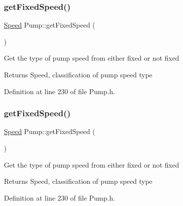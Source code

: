 \mbox{\label{class_pump_ae9a63b7e616ba2ef7723d1040af241b4}} 
\subsubsection{\texorpdfstring{get\+Fixed\+Speed()}{getFixedSpeed()}\hspace{0.1cm}{\footnotesize\ttfamily [1/3]}}
{\footnotesize\ttfamily \hyperlink{class_pump_ae443603074ebca82f0b89209482d10b6}{Speed} Pump\+::get\+Fixed\+Speed (\begin{DoxyParamCaption}{ }\end{DoxyParamCaption})\hspace{0.3cm}{\ttfamily [inline]}}

Get the type of pump speed from either fixed or not fixed

\begin{DoxyReturn}{Returns}
Speed, classification of pump speed type 
\end{DoxyReturn}


Definition at line 230 of file Pump.\+h.

\mbox{\label{class_pump_ae9a63b7e616ba2ef7723d1040af241b4}} 
\subsubsection{\texorpdfstring{get\+Fixed\+Speed()}{getFixedSpeed()}\hspace{0.1cm}{\footnotesize\ttfamily [2/3]}}
{\footnotesize\ttfamily \hyperlink{class_pump_ae443603074ebca82f0b89209482d10b6}{Speed} Pump\+::get\+Fixed\+Speed (\begin{DoxyParamCaption}{ }\end{DoxyParamCaption})\hspace{0.3cm}{\ttfamily [inline]}}

Get the type of pump speed from either fixed or not fixed

\begin{DoxyReturn}{Returns}
Speed, classification of pump speed type 
\end{DoxyReturn}


Definition at line 230 of file Pump.\+h.

